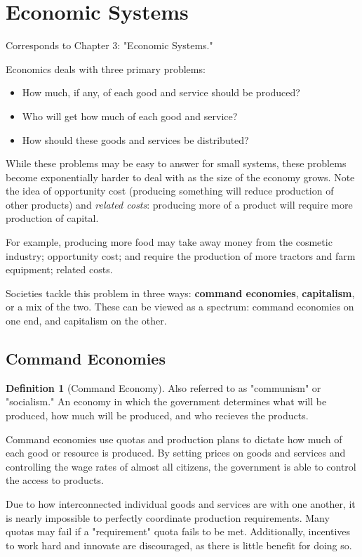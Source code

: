 \documentclass[12pt, a4paper]{article}
\theoremstyle{definition}
\newtheorem{definition}{Definition}
\begin{document}
\section{Economic Systems}
Corresponds to Chapter 3: "Economic Systems."

Economics deals with three primary problems:
\begin{itemize}
    \item How much, if any, of each good and service should be produced?
    \item Who will get how much of each good and service?
    \item How should these goods and services be distributed?
\end{itemize}

While these problems may be easy to answer for small systems, these problems become exponentially harder to deal with as the size of the economy grows.
Note the idea of opportunity cost (producing something will reduce production of other products) 
and \textit{related costs}: producing more of a product will require more production of capital.

For example, producing more food may take away money from the cosmetic industry; opportunity cost; and require the production of more tractors and farm equipment; related costs.

Societies tackle this problem in three ways: \textbf{command economies}, \textbf{capitalism}, or a mix of the two.
These can be viewed as a spectrum: command economies on one end, and capitalism on the other.

\subsection{Command Economies}
\begin{definition}[Command Economy]
    Also referred to as "communism" or "socialism."
    An economy in which the government determines what will be produced, how much will be produced, and who recieves the products.
\end{definition}

Command economies use quotas and production plans to dictate how much of each good or resource is produced. 
By setting prices on goods and services and controlling the wage rates of almost all citizens, the government is able to control the access to products.

Due to how interconnected individual goods and services are with one another, it is nearly impossible to perfectly coordinate production requirements.
Many quotas may fail if a "requirement" quota fails to be met.
Additionally, incentives to work hard and innovate are discouraged, as there is little benefit for doing so.
\end{document}
